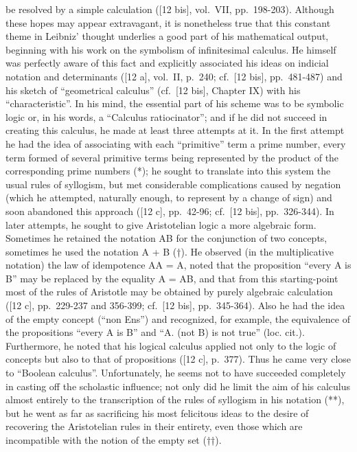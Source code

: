 be resolved by a simple calculation ({[}12 bis{]}, vol.~VII, pp.~198-203). Although these hopes may appear extravagant, it is nonetheless true that this constant theme in Leibniz' thought underlies a good part of his mathematical output, beginning with his work on the symbolism of infinitesimal calculus. He himself was perfectly aware of this fact and explicitly associated his ideas on indicial notation and determinants ({[}12 a{]}, vol.~II, p.~240; cf.~{[}12 bis{]}, pp.~481-487) and his sketch of ``geometrical calculus'' (cf.~{[}12 bis{]}, Chapter IX) with his ``characteristic''. In his mind, the essential part of his scheme was to be symbolic logic or, in his words, a ``Calculus ratiocinator''; and if he did not succeed in creating this calculus, he made at least three attempts at it. In the first attempt he had the idea of associating with each ``primitive'' term a prime number, every term formed of several primitive terms being represented by the product of the corresponding prime numbers (*); he sought to translate into this system the usual rules of syllogism, but met considerable complications caused by negation (which he attempted, naturally enough, to represent by a change of sign) and soon abandoned this approach ({[}12 c{]}, pp.~42-96; cf.~{[}12 bis{]}, pp.~326-344). In later attempts, he sought to give Aristotelian logic a more algebraic form. Sometimes he retained the notation AB for the conjunction of two concepts, sometimes he used the notation A + B (†). He observed (in the multiplicative notation) the law of idempotence AA = A, noted that the proposition ``every A is B'' may be replaced by the equality A = AB, and that from this starting-point most of the rules of Aristotle may be obtained by purely algebraic calculation ({[}12 c{]}, pp.~229-237 and 356-399; cf.~{[}12 bis{]}, pp.~345-364). Also he had the idea of the empty concept (``non Ens'') and recognized, for example, the equivalence of the propositions ``every A is B'' and ``A. (not B) is not true'' (loc. cit.). Furthermore, he noted that his logical calculus applied not only to the logic of concepts but also to that of propositions ({[}12 c{]}, p.~377). Thus he came very close to ``Boolean calculus''. Unfortunately, he seems not to have succeeded completely in casting off the scholastic influence; not only did he limit the aim of his calculus almost entirely to the transcription of the rules of syllogism in his notation (**), but he went as far as sacrificing his most felicitous ideas to the desire of recovering the Aristotelian rules in their entirety, even those which are incompatible with the notion of the empty set (††).

